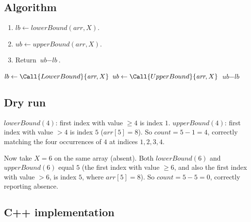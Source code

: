 \subsection*{Algorithm}

\begin{enumerate}
  \item $\textit{lb} \gets \textit{lowerBound}(\textit{arr}, X)$.
  \item $\textit{ub} \gets \textit{upperBound}(\textit{arr}, X)$.
  \item Return $\textit{ub} - \textit{lb}$.
\end{enumerate}

\begin{algorithm}[H]
\caption{Count Occurrences}
\begin{algorithmic}[1]
  \State $\textit{lb} \gets \Call{LowerBound}{\textit{arr}, X}$
  \State $\textit{ub} \gets \Call{UpperBound}{\textit{arr}, X}$
  \State \Return $\textit{ub} - \textit{lb}$
\EndProcedure
\end{algorithmic}
\end{algorithm}

\subsection*{Dry run}


$\textit{lowerBound}(4)$: first index with value $\ge 4$ is index $1$.
$\textit{upperBound}(4)$: first index with value $> 4$ is index $5$
($\textit{arr}[5]=8$). So $\textit{count} = 5 - 1 = 4$, correctly matching
the four occurrences of $4$ at indices $1,2,3,4$.

Now take $X = 6$ on the same array (absent). Both
$\textit{lowerBound}(6)$ and $\textit{upperBound}(6)$ equal $5$ (the first
index with value $\ge 6$, and also the first index with value $>6$, is
index $5$, where $\textit{arr}[5]=8$). So $\textit{count} = 5-5=0$,
correctly reporting absence.

\subsection*{C++ implementation}


